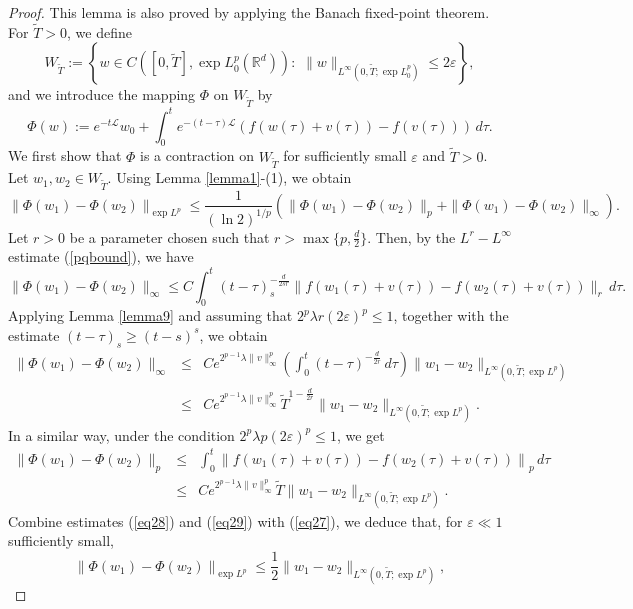 \documentclass[10pt,a4paper]{amsart}
\begin{document}
\begin{proof} This lemma is also proved by applying the Banach fixed-point theorem. For $\widetilde{T}>0$, we define
$$W_{\widetilde{T}}:=\left\{w\in C([0,\widetilde{T}],\exp L^p_0(\mathbb{R}^d)):\,\,\|w\|_{L^\infty(0,\widetilde{T};\exp L^p_0)}\leq 2\varepsilon\right\},$$
and we introduce the mapping $\Phi$ on $ W_{\widetilde{T}}$ by
$$\Phi(w):=e^{-t\mathcal{L}}w_0+\int_0^te^{-(t-\tau)\mathcal{L}}\left(f(w(\tau)+v(\tau))-f(v(\tau))\right)\,d\tau.$$
We first show that $\Phi$ is a contraction on $W_{\widetilde{T}}$ for sufficiently small $\varepsilon$ and $\widetilde{T}>0$. Let $w_1,w_2\in W_{\widetilde{T}}$. Using Lemma \ref{lemma1}-(1), we obtain
\begin{equation}\label{eq27}
\|\Phi(w_1)-\Phi(w_2)\|_{\exp L^p}\leq \frac{1}{(\ln 2)^{1/p}}\left(\|\Phi(w_1)-\Phi(w_2)\|_{p}+\|\Phi(w_1)-\Phi(w_2)\|_{\infty}\right).
\end{equation}
Let $r>0$ be a parameter chosen such that $r>\max\{p,\frac{d}{2}\}$. Then, by the $L^r-L^\infty$ estimate (\ref{pqbound}), we have
$$\|\Phi(w_1)-\Phi(w_2)\|_{\infty}\leq C\int_0^t(t-\tau)_s^{-\frac{d}{2 s r}}\|f(w_1(\tau)+v(\tau))-f(w_2(\tau)+v(\tau))\|_r\,d\tau.$$
Applying Lemma \ref{lemma9} and assuming that $2^p\lambda r (2\varepsilon)^p\leq1$, together with the estimate $(t-\tau)_s\geq (t-s)^s$, we obtain
\begin{eqnarray}\label{eq28}
\|\Phi(w_1)-\Phi(w_2)\|_{\infty}&\leq& Ce^{2^{p-1}\lambda\|v\|_\infty^p}\left(\int_0^t(t-\tau)^{-\frac{d}{2 r}}\,d\tau\right)\|w_1-w_2\|_{L^\infty(0,\widetilde{T};\exp L^p)}\nonumber\\
&\leq& Ce^{2^{p-1}\lambda\|v\|_\infty^p}\widetilde{T}^{1-\frac{d}{2 r}}\|w_1-w_2\|_{L^\infty(0,\widetilde{T};\exp L^p)}.
\end{eqnarray}
In a similar way, under the condition $2^p\lambda p (2\varepsilon)^p\leq1$, we get
\begin{eqnarray}\label{eq29}
\|\Phi(w_1)-\Phi(w_2)\|_{p}&\leq& \int_0^t\left\|f(w_1(\tau)+v(\tau))-f(w_2(\tau)+v(\tau))\right\|_{p}\,d\tau\nonumber\\
&\leq& Ce^{2^{p-1}\lambda\|v\|_\infty^p}\widetilde{T}\|w_1-w_2\|_{L^\infty(0,\widetilde{T};\exp L^p)}.
\end{eqnarray}
Combine estimates (\ref{eq28}) and (\ref{eq29}) with (\ref{eq27}), we deduce that, for $\varepsilon\ll1$ sufficiently small,
\begin{equation}\label{eq30}
\|\Phi(w_1)-\Phi(w_2)\|_{\exp L^p}\leq \frac{1}{2}\|w_1-w_2\|_{L^\infty(0,\widetilde{T};\exp L^p)},

\end{equation}
\end{proof}
\end{document}
